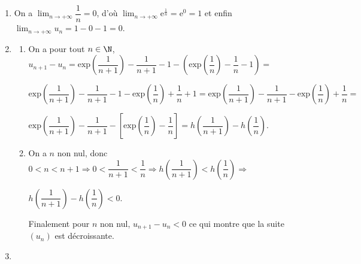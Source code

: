 \begin{enumerate}[resume]
\item %
On a $\displaystyle\lim_{n \to + \infty} \dfrac{1}{n} = 0$, d'où $\displaystyle\lim_{n \to + \infty} \text{e}^{\frac1n} = \text{e}^0 = 1$ et enfin $\displaystyle\lim_{n \to + \infty} u_n = 1 - 0 - 1 = 0$.
\item 
	\begin{enumerate}
		\item %
		

On a pour tout $n \in \N$, \: $u_{n+1} - u_n = \text{exp} \left(\dfrac{1}{n+1}\right) - \dfrac{1}{n+1} - 1 - \left(\text{exp} \left(\dfrac{1}{n}\right) - \dfrac{1}{n} - 1 \right) =$

$ \text{exp} \left(\dfrac{1}{n+1}\right) - \dfrac{1}{n+1} - 1 - \text{exp} \left(\dfrac{1}{n}\right) + \dfrac{1}{n} + 1 = \text{exp} \left(\dfrac{1}{n+1}\right) - \dfrac{1}{n+1}  - \text{exp} \left(\dfrac{1}{n}\right) + \dfrac{1}{n}  =$

$\text{exp} \left(\dfrac{1}{n+1}\right) - \dfrac{1}{n+1}  - \left[\text{exp} \left(\dfrac{1}{n}\right) - \dfrac{1}{n}\right] =  h\left(\dfrac{1}{n + 1}\right) - h\left(\dfrac{1}{n}\right)$.
		\item %
		
On a $n$ non nul, donc $0 < n < n + 1 \Rightarrow 0< \dfrac{1}{n+1} < \dfrac{1}{n} \Rightarrow h\left(\dfrac{1}{n+1}\right) < h\left(\dfrac{1}{n}\right) \Rightarrow$
		
		$ h\left(\dfrac{1}{n + 1}\right) - h\left(\dfrac{1}{n}\right) < 0$.
		
		Finalement pour $n$ non nul, $u_{n+1} - u_n < 0$ ce qui montre que la suite $\left(u_n\right)$ est décroissante.
	\end{enumerate}
\item %


\end{enumerate}
